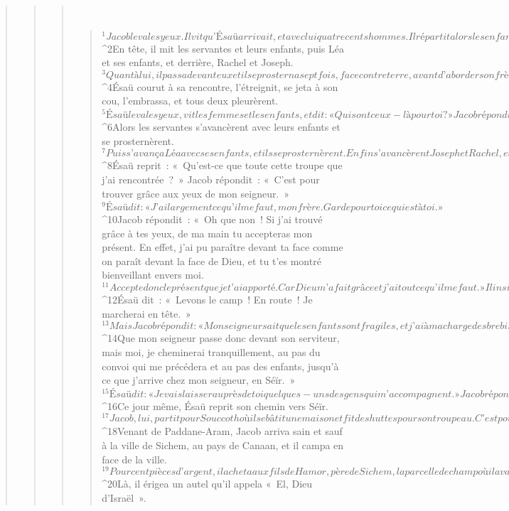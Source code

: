 \begin{verse}
\begin{verse}
\begin{verse}
         
      \bchapter{}
      \begin{verse}
${}^{1}Jacob leva les yeux. Il vit qu’Ésaü arrivait, et avec lui quatre cents hommes. Il répartit alors les enfants entre Léa, Rachel et les deux servantes. 
${}^{2}En tête, il mit les servantes et leurs enfants, puis Léa et ses enfants, et derrière, Rachel et Joseph. 
${}^{3}Quant à lui, il passa devant eux et il se prosterna sept fois, face contre terre, avant d’aborder son frère. 
${}^{4}Ésaü courut à sa rencontre, l’étreignit, se jeta à son cou, l’embrassa, et tous deux pleurèrent. 
${}^{5}Ésaü leva les yeux, vit les femmes et les enfants, et dit : « Qui sont ceux-là pour toi ? » Jacob répondit : « Ce sont les enfants que Dieu a accordés à ton serviteur. » 
${}^{6}Alors les servantes s’avancèrent avec leurs enfants et se prosternèrent. 
${}^{7}Puis s’avança Léa avec ses enfants, et ils se prosternèrent. Enfin s’avancèrent Joseph et Rachel, et ils se prosternèrent.
${}^{8}Ésaü reprit : « Qu’est-ce que toute cette troupe que j’ai rencontrée ? » Jacob répondit : « C’est pour trouver grâce aux yeux de mon seigneur. »
${}^{9}Ésaü dit : « J’ai largement ce qu’il me faut, mon frère. Garde pour toi ce qui est à toi. » 
${}^{10}Jacob répondit : « Oh que non ! Si j’ai trouvé grâce à tes yeux, de ma main tu accepteras mon présent. En effet, j’ai pu paraître devant ta face comme on paraît devant la face de Dieu, et tu t’es montré bienveillant envers moi. 
${}^{11}Accepte donc le présent que je t’ai apporté. Car Dieu m’a fait grâce et j’ai tout ce qu’il me faut. » Il insista auprès de lui et celui-ci accepta.
${}^{12}Ésaü dit : « Levons le camp ! En route ! Je marcherai en tête. » 
${}^{13}Mais Jacob répondit : « Mon seigneur sait que les enfants sont fragiles, et j’ai à ma charge des brebis et des vaches qui allaitent. Si on presse l’allure un seul jour, tout le petit bétail meurt ! 
${}^{14}Que mon seigneur passe donc devant son serviteur, mais moi, je cheminerai tranquillement, au pas du convoi qui me précédera et au pas des enfants, jusqu’à ce que j’arrive chez mon seigneur, en Séïr. » 
${}^{15}Ésaü dit : « Je vais laisser auprès de toi quelques-uns des gens qui m’accompagnent. » Jacob répondit : « À quoi bon ? Pourvu que je trouve grâce aux yeux de mon seigneur ! » 
${}^{16}Ce jour même, Ésaü reprit son chemin vers Séïr. 
${}^{17}Jacob, lui, partit pour Souccoth où il se bâtit une maison et fit des huttes pour son troupeau. C’est pourquoi on appela cet endroit « Souccoth » (c’est-à-dire : Huttes).
${}^{18}Venant de Paddane-Aram, Jacob arriva sain et sauf à la ville de Sichem, au pays de Canaan, et il campa en face de la ville. 
${}^{19}Pour cent pièces d’argent, il acheta aux fils de Hamor, père de Sichem, la parcelle de champ où il avait dressé sa tente. 
${}^{20}Là, il érigea un autel qu’il appela « El, Dieu d’Israël ».
      

\end{verse}
\end{verse}
\end{verse}
\end{verse}

